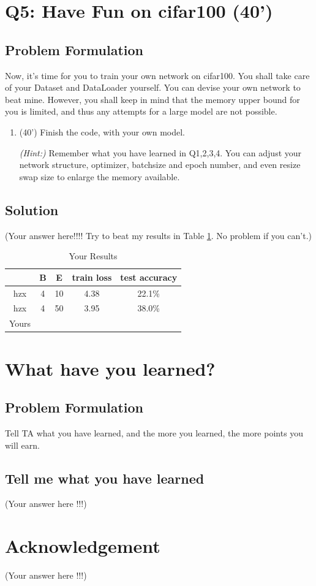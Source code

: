 \documentclass[12pt,a4paper]{article}
\theoremstyle{definition}
\begin{document}
\section{Q5: Have Fun on cifar100 (40')}
\subsection{Problem Formulation}
Now, it's time for you to train your own network on cifar100. You shall take care of your Dataset and DataLoader yourself. You can devise your own network to beat mine. However, you shall keep in mind that the memory upper bound for you is limited, and thus any attempts for a large model are not possible.

\begin{enumerate}
    \item (40') Finish the code, with your own model.

    \textit{(Hint:)} Remember what you have learned in Q1,2,3,4. You can adjust your network structure, optimizer, batchsize and epoch number, and even resize swap size to enlarge the memory available.
\end{enumerate}

\subsection{Solution}
(Your answer here!!!!
   Try to beat my results in Table \ref{fine-tune}. No problem if you can't.)
    \begin{table}[H]
        \centering
        \begin{tabular}{c|cc|cc}
        \toprule[1.5pt]
        & B & E & train loss & test accuracy \\
        \hline
        hzx & 4 & 10 & 4.38 & 22.1\% \\
        hzx & 4 & 50 & 3.95 & 38.0\% \\
        Yours &  &  & & \\
        \bottomrule[1.5pt]
        \end{tabular}
        \caption{Your Results}
        \label{fine-tune}
    \end{table}

\section{What have you learned?}
\subsection{Problem Formulation}
Tell TA what you have learned, and the more you learned, the more points you will earn.

\subsection{Tell me what you have learned}
(Your answer here !!!)

\section{Acknowledgement}
(Your answer here !!!)



\end{document}
